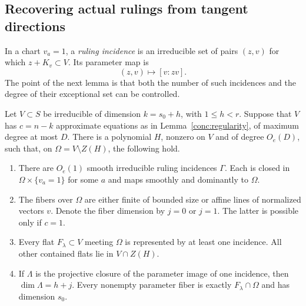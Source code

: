 \subsection{Recovering actual rulings from tangent directions}

In a chart $v_a=1$, a \emph{ruling incidence} is an irreducible set of
pairs $(z,v)$ for which $z+K_v\subset V$.  Its parameter map is
\begin{equation}
 (z,v)\longmapsto[v:zv].
 \label{conc:parameter-map}
\end{equation}
The point of the next lemma is that both the number of such incidences
and the degree of their exceptional set can be controlled.

\begin{lemma}
\label{conc:rulings}
Let $V\subset S$ be irreducible of dimension $k=s_0+h$, with
$1\leq h<r$.  Suppose that $V$ has $c=n-k$ approximate equations as
in Lemma~\ref{conc:regularity}, of maximum degree at most $D$.
There is a polynomial $H$, nonzero on $V$ and of degree $O_e(D)$,
such that, on $\Omega=V\setminus Z(H)$, the following hold.
\begin{enumerate}
\item There are $O_e(1)$ smooth irreducible ruling incidences $\Gamma$.
      Each is closed in $\Omega\times\{v_a=1\}$ for some $a$ and maps
      smoothly and dominantly to $\Omega$.
\item The fibers over $\Omega$ are either finite of bounded size or
      affine lines of normalized vectors $v$.  Denote the fiber
      dimension by $j=0$ or $j=1$.  The latter is possible only if
      $c=1$.
\item Every flat $F_\lambda\subset V$ meeting $\Omega$ is represented
      by at least one incidence.  All other contained flats lie in
      $V\cap Z(H)$.
\item If $\Lambda$ is the projective closure of the parameter image
      of one incidence, then $\dim\Lambda=h+j$.  Every nonempty
      parameter fiber is exactly $F_\lambda\cap\Omega$ and has
      dimension $s_0$.
\end{enumerate}
\end{lemma}

